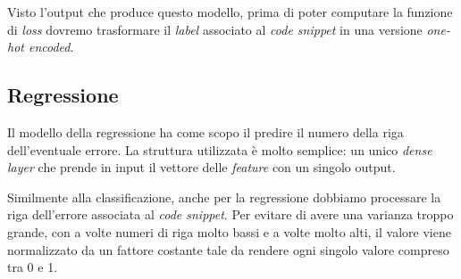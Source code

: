 Visto l'output che produce questo modello, prima di poter computare la funzione di \textit{loss} dovremo trasformare il \textit{label} associato al \textit{code snippet} in una versione \textit{one-hot encoded}. 




\subsection{Regressione}
Il modello della regressione ha come scopo il predire il numero della riga dell'eventuale errore.
La struttura utilizzata è molto semplice: un unico \textit{dense layer} che prende in input il vettore delle \textit{feature} con un singolo output.

Similmente alla classificazione, anche per la regressione dobbiamo processare la riga dell'errore associata al \textit{code snippet}. 
Per evitare di avere una varianza troppo grande, con a volte numeri di riga molto bassi e a volte molto alti, il valore viene normalizzato da un fattore costante tale da rendere ogni singolo valore compreso tra 0 e 1.



